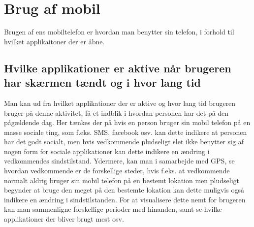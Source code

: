 \section{Brug af mobil}
Brugen af ens mobiltelefon er hvordan man benytter sin telefon, i forhold til hvilket applikaitoner der er åbne.

\subsection{Hvilke applikationer er aktive når brugeren har skærmen tændt og i hvor lang tid}
Man kan ud fra hvilket applikationer der er aktive og hvor lang tid brugeren bruger på denne aktivitet, få et indblik i hvordan personen har det på den pågældende dag.
Her tænkes der på hvis en person bruger sin mobil telefon på en masse sociale ting, som f.eks. SMS, facebook osv. kan dette indikere at personen har det godt socialt, men hvis vedkommende pludseligt slet ikke benytter sig af nogen form for sociale applikationer kan dette indikere en ændring i vedkommendes sindstilstand.
Ydermere, kan man i samarbejde med GPS, se hvordan vedkommende er de forskellige steder, hvis f.eks. at vedkommende normalt aldrig bruger sin mobil telefon på en bestemt lokation men pludseligt begynder at bruge den meget på den bestemte lokation kan dette muligvis også indikere en ændring i sindstilstanden.
For at visualisere dette nemt for brugeren kan man sammenligne forskellige perioder med hinanden, samt se hvilke applikationer der bliver brugt mest osv.

